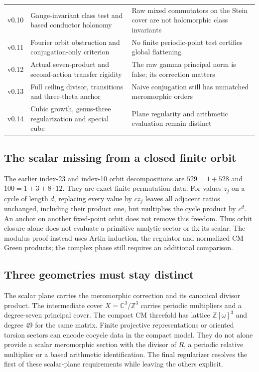 \begin{longtable}{p{.14\linewidth}p{.43\linewidth}p{.34\linewidth}}
v0.10 & Gauge-invariant class test and based conductor holonomy & Raw mixed commutators on the Stein cover are not holomorphic class invariants\\
v0.11 & Fourier orbit obstruction and conjugation-only criterion & No finite periodic-point test certifies global flattening\\
v0.12 & Actual seven-product and second-action transfer rigidity & The raw gamma principal norm is false; its correction matters\\
v0.13 & Full ceiling divisor, transitions and three-theta anchor & Naive conjugation still has unmatched meromorphic orders\\
v0.14 & Cubic growth, genus-three regularization and special cube & Plane regularity and arithmetic evaluation remain distinct\\\bottomrule
\end{longtable}

\subsection{The scalar missing from a closed finite orbit}
The earlier index-23 and index-10 orbit decompositions are $529=1+528$ and $100=1+3+8\cdot12$. They are exact finite permutation data. For values $z_j$ on a cycle of length $d$, replacing every value by $cz_j$ leaves all adjacent ratios unchanged, including their product one, but multiplies the cycle product by $c^d$. An anchor on another fixed-point orbit does not remove this freedom. Thus orbit closure alone does not evaluate a primitive analytic sector or fix its scalar. The modulus proof instead uses Artin induction, the regulator and normalized CM Green products; the complex phase still requires an additional comparison.

\subsection{Three geometries must stay distinct}
The scalar plane carries the meromorphic correction and its canonical divisor product. The intermediate cover $X=\mathbb C^3/\mathbb Z^3$ carries periodic multipliers and a degree-seven principal cover. The compact CM threefold has lattice $\mathbb Z[\omega]^3$ and degree 49 for the same matrix. Finite projective representations or oriented torsion sectors can encode cocycle data in the compact model. They do not alone provide a scalar meromorphic section with the divisor of $R$, a periodic relative multiplier or a based arithmetic identification. The final regularizer resolves the first of these scalar-plane requirements while leaving the others explicit.


